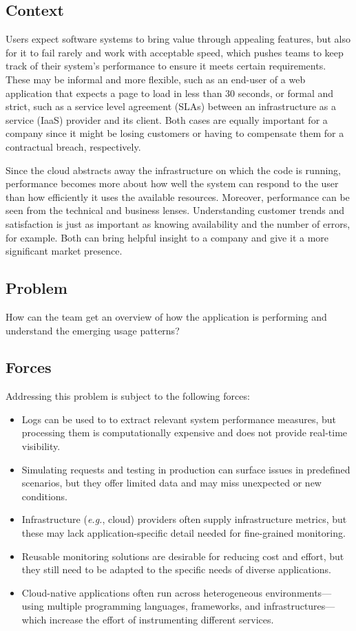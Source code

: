 \documentclass[runningheads]{llncs}
\begin{document}
\subsection{Context}
Users expect software systems to bring value through appealing features, but also for it to fail rarely and work with acceptable speed, which pushes teams to keep track of their system’s performance to ensure it meets certain requirements. These may be informal and more flexible, such as an end-user of a web application that expects a page to load in less than 30 seconds, or formal and strict, such as a service level agreement (SLAs) between an infrastructure as a service (IaaS) provider and its client. Both cases are equally important for a company since it might be losing customers or having to compensate them for a contractual breach, respectively.

Since the cloud abstracts away the infrastructure on which the code is running, performance becomes more about how well the system can respond to the user than how efficiently it uses the available resources. Moreover, performance can be seen from the technical and business lenses. Understanding customer trends and satisfaction is just as important as knowing availability and the number of errors, for example. Both can bring helpful insight to a company and give it a more significant market presence.

\subsection{Problem}
How can the team get an overview of how the application is performing and understand the emerging usage patterns?

\subsection{Forces}
Addressing this problem is subject to the following forces:

\begin{itemize}
    \item Logs can be used to to extract relevant system performance measures, but processing them is computationally expensive and does not provide real-time visibility.
    \item Simulating requests and testing in production can surface issues in predefined scenarios, but they offer limited data and may miss unexpected or new conditions.
    \item Infrastructure (\textit{e.g.}, cloud) providers often supply infrastructure metrics, but these may lack application-specific detail needed for fine-grained monitoring.
    \item Reusable monitoring solutions are desirable for reducing cost and effort, but they still need to be adapted to the specific needs of diverse applications.    
    \item Cloud-native applications often run across heterogeneous environments---using multiple programming languages, frameworks, and infrastructures---which increase the effort of instrumenting different services.    
\end{itemize}
\end{document}
